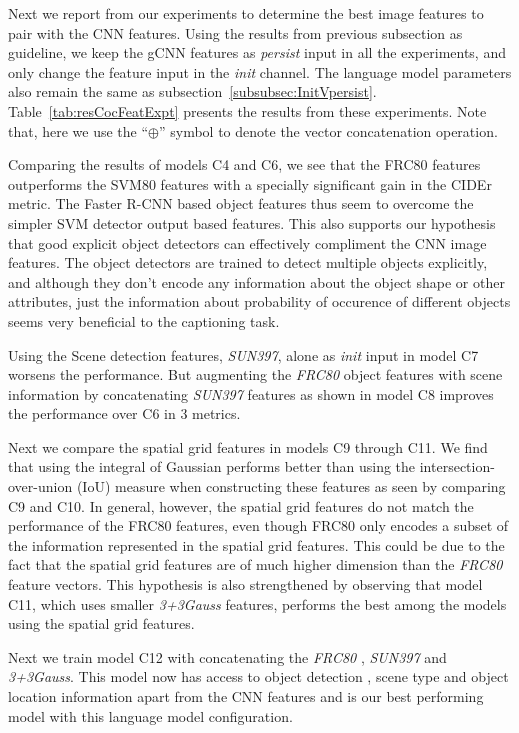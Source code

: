 Next we report from our experiments to determine the best image features to pair
with the CNN features.
Using the results from previous subsection as guideline, we keep the gCNN
features as \emph{persist} input in all the experiments, and only change the
feature input in the \emph{init} channel.
The language model parameters also remain the same as
subsection~\ref{subsubsec:InitVpersist}.
Table~\ref{tab:resCocFeatExpt} presents the results from these experiments.
Note that, here we use the ``$\oplus$'' symbol to denote the vector
concatenation operation.

Comparing the results of models C4 and C6, we see that the FRC80 features
outperforms the SVM80 features with a specially significant gain in the CIDEr
metric.
The Faster R-CNN based object features thus seem to overcome the simpler SVM
detector output based features.
This also supports our hypothesis that good explicit object detectors can
effectively compliment the CNN image features. 
The object detectors are trained to detect multiple objects explicitly, and
although they don't encode any information about the object shape or other
attributes, just the information about probability of occurence of different
objects seems very beneficial to the captioning task.

Using the Scene detection features, \emph{SUN397}, alone as \emph{init} input in
model C7 worsens the performance.
But augmenting the \emph{FRC80} object features with scene information by
concatenating \emph{SUN397} features as shown in model C8 improves the
performance over C6 in 3 metrics.

Next we compare the spatial grid features in models C9 through C11.
We find that using the integral of Gaussian performs better than using the
intersection-over-union (IoU) measure when constructing these features as seen
by comparing C9 and C10. 
In general, however, the spatial grid features do not match the performance of
the FRC80 features, even though FRC80 only encodes a subset of the information
represented in the spatial grid features.
This could be due to the fact that the spatial grid features are of much higher
dimension than the \emph{FRC80} feature vectors.
This hypothesis is also strengthened by observing that model C11, which uses
smaller \emph{3+3Gauss} features, performs the best among the models using the spatial
grid features.

Next we train model C12 with concatenating the \emph{FRC80} , \emph{SUN397}  and
\emph{3+3Gauss}. 
This model now has access to object detection , scene type and object location
information apart from the CNN features and is our best performing model with
this language model configuration.


